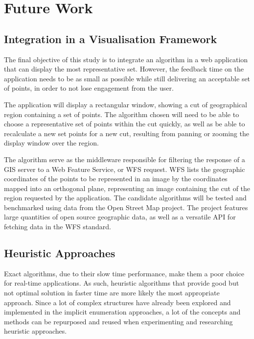 \chapter{Future Work}
\label{chap:future}
\section{Integration in a Visualisation Framework}

The final objective of this study is to integrate an algorithm in a web application that can display the most representative set. However, the feedback time on the application needs to be as small as possible while still delivering an acceptable set of points, in order to not lose engagement from the user.

The application will display a rectangular window, showing a cut of geographical region containing a set of points. The algorithm chosen will need to be able to choose a representative set of points within the cut quickly, as well as be able to recalculate a new set points for a new cut, resulting from panning or zooming the display window over the region.

The algorithm serve as the middleware responsible for filtering the response of a GIS server to a Web Feature Service, or WFS request. WFS lists the geographic coordinates of the points to be represented in an image by the coordinates mapped into an orthogonal plane, representing an image containing the cut of the region requested by the application.
The candidate algorithms will be tested and benchmarked using data from the Open Street Map project. The project features large quantities of open source geographic data, as well as a versatile API for fetching data in the WFS standard.
\section{Heuristic Approaches}

Exact algorithms, due to their slow time performance, make them a poor choice for real-time applications. As such, heuristic algorithms that provide good but not optimal solution in faster time are more likely the most appropriate approach.
Since a lot of complex structures have already been explored and implemented in the implicit enumeration approaches, a lot of the concepts and methods can be repurposed and reused when experimenting and researching heuristic approaches. 


